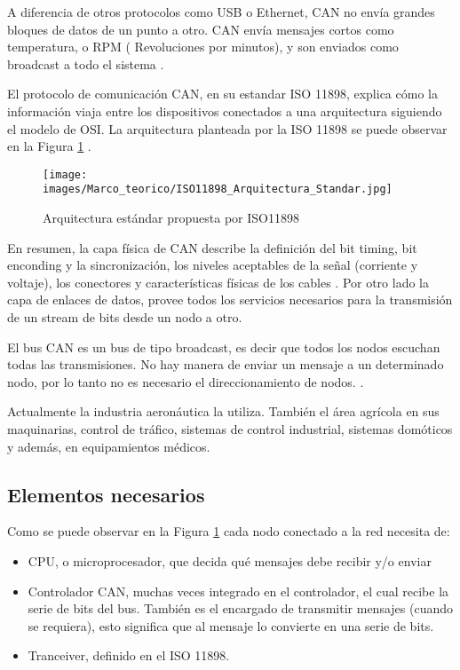A diferencia de otros protocolos como USB o Ethernet, CAN no envía grandes bloques de datos de un punto a otro. CAN envía mensajes cortos como temperatura, o RPM ( Revoluciones por minutos), y son enviados como broadcast a todo el sistema \citep{texasCAN}.

El protocolo de comunicación CAN, en su estandar ISO 11898, explica cómo la información viaja entre los dispositivos
conectados a una arquitectura siguiendo el modelo de OSI. La arquitectura planteada
por la ISO 11898 se puede observar en la Figura \ref{fig:iso11898} \citep{texasCAN}.

\begin{figure}[h]
 \centering
 \texttt{[image: images/Marco\_teorico/ISO11898\_Arquitectura\_Standar.jpg]}
  \caption{Arquitectura estándar propuesta por ISO11898}
\label{fig:iso11898}
\end{figure}

En resumen, la capa física de CAN  describe la definición del bit timing, bit enconding y la sincronización, los niveles aceptables de la señal (corriente y voltaje), los conectores y características físicas de los cables \citep{texasCAN}. Por otro lado la capa de enlaces de datos, provee todos los servicios necesarios para la transmisión de un stream de bits desde un nodo a otro.

El bus CAN es un bus de tipo broadcast, es decir que todos los nodos escuchan todas las transmisiones. No hay manera de enviar un mensaje a un determinado nodo, por lo tanto no es necesario el direccionamiento de nodos. \citep{kvaserWEB}.

Actualmente la industria aeronáutica la utiliza. También el área agrícola en sus maquinarias, control de tráfico, sistemas de control industrial, sistemas domóticos y además, en equipamientos médicos.

\subsection{Elementos necesarios}
Como se puede observar en la Figura \ref{fig:iso11898} cada nodo conectado a la red necesita de:

\begin{itemize}
\item \ac{CPU}, o microprocesador, que decida qué mensajes debe recibir y/o enviar
\item Controlador CAN, muchas veces integrado en el controlador, el cual recibe la serie de bits del bus. También es el encargado de transmitir mensajes (cuando se requiera), esto significa que al mensaje lo convierte en una serie de bits.
  \item Tranceiver, definido en el ISO 11898.
\end{itemize}


